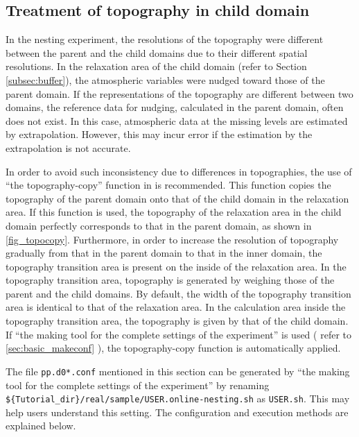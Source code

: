\subsection{Treatment of topography in child domain} \label{subsec:nest_topo}
In the nesting experiment, the resolutions of the topography were different between the parent and the child domains due to their different spatial resolutions. In the relaxation area of the child domain (refer to Section \ref{subsec:buffer}), the atmospheric variables were nudged toward those of the parent domain. If the representations of the topography are different between two domains, the reference data for nudging, calculated in the parent domain, often does not exist. In this case, atmospheric data at the missing levels are estimated by extrapolation. However, this may incur error if the estimation by the extrapolation is not accurate.

In order to avoid such inconsistency due to differences in topographies, the use of ``the topography-copy'' function in \scalerm is recommended. This function copies the topography of the parent domain onto that of the child domain in the relaxation area. If this function is used, the topography of the relaxation area in the child domain perfectly corresponds to that in the parent domain, as shown in \ref{fig_topocopy}.  Furthermore, in order to increase the resolution of topography gradually from that in the parent domain to that in the inner domain, the topography transition area is present on the inside of the relaxation area. In the topography transition area, topography is generated by weighing those of the parent and the child domains. By default, the width of the topography transition area is identical to that of the relaxation area. In the calculation area inside the topography transition area, the topography is given by that of the child domain. If ``the making tool for the complete settings of the experiment'' is used ( refer to \ref{sec:basic_makeconf} ), the topography-copy function is automatically applied.

The file \verb|pp.d0*.conf| mentioned in this section can be generated by  ``the making tool for the complete settings of the experiment'' by renaming \\ \verb|${Tutorial_dir}/real/sample/USER.online-nesting.sh| as \verb|USER.sh|. This may help users understand this setting. The configuration and execution methods are explained below.

